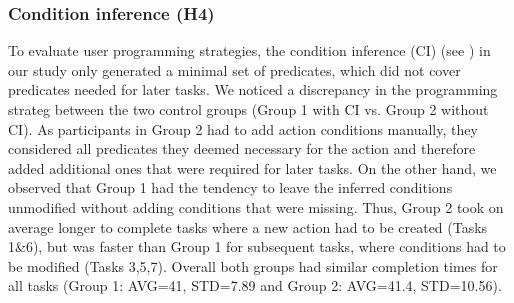 

\subsubsection{Condition inference (H4)} 
To evaluate user programming strategies, the condition inference (CI) (see ) in our study only generated a minimal set of predicates, which did not cover predicates needed for later tasks.
We noticed a discrepancy in the programming strateg between the two control groups (Group 1 with CI vs. Group 2 without CI).
As participants in Group 2 had to add action conditions manually, they considered all predicates they deemed necessary for the action and therefore added additional ones that were required for later tasks.
On the other hand, we observed that Group 1 had the tendency to leave the inferred conditions unmodified without adding conditions that were missing.
Thus, Group 2 took on average longer to complete tasks where a new action had to be created (Tasks 1\&6), but was faster than Group 1 for subsequent tasks, where conditions had to be modified (Tasks 3,5,7).
Overall both groups had similar completion times for all tasks (Group 1: AVG=41, STD=7.89 and Group 2: AVG=41.4, STD=10.56).

